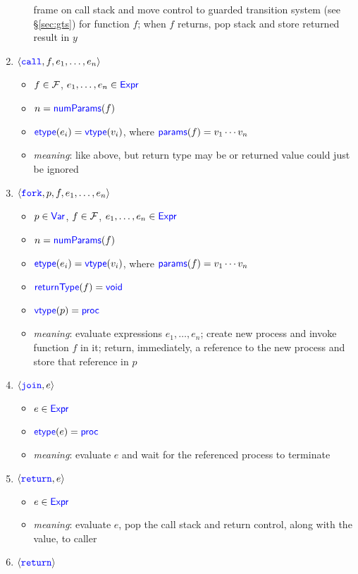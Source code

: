 \documentclass[11pt, oneside, letterpaper]{book}
\begin{document}
\begin{enumerate}
\begin{itemize}
    frame on call stack and move control to guarded transition system
    (see \S\ref{sec:gts}) for function $f$; when $f$ returns, pop
    stack and store returned result in $y$
  \end{itemize}
\item $\langle\texttt{\textcolor{blue}{call}},f,e_1,\ldots,e_n\rangle$
  \begin{itemize}
  \item $f\in\mathcal{F}$, $e_1,\ldots,e_n\in\textsf{\textcolor{blue}{\textup{Expr}}}$
  \item $n=\textsf{\textcolor{blue}{\textup{numParams}}}(f)$
  \item $\textsf{\textcolor{blue}{\textup{etype}}}(e_i)=\textsf{\textcolor{blue}{\textup{vtype}}}(v_i)$, where $\textsf{\textcolor{blue}{\textup{params}}}(f)=v_1\cdots v_n$
  \item \emph{meaning}: like above, but return type may be 
    or returned value could just be ignored
  \end{itemize}
\item $\langle\texttt{\textcolor{blue}{fork}},p,f,e_1,\ldots,e_n\rangle$
  \begin{itemize}
  \item $p\in\textsf{\textcolor{blue}{\textup{Var}}}$, $f\in\mathcal{F}$, $e_1,\ldots,e_n\in\textsf{\textcolor{blue}{\textup{Expr}}}$
  \item $n=\textsf{\textcolor{blue}{\textup{numParams}}}(f)$
  \item $\textsf{\textcolor{blue}{\textup{etype}}}(e_i)=\textsf{\textcolor{blue}{\textup{vtype}}}(v_i)$, where $\textsf{\textcolor{blue}{\textup{params}}}(f)=v_1\cdots v_n$
  \item $\textsf{\textcolor{blue}{\textup{returnType}}}(f)=\textsf{\textcolor{blue}{\textup{void}}}$
  \item $\textsf{\textcolor{blue}{\textup{vtype}}}(p)=\textsf{\textcolor{blue}{\textup{proc}}}$
  \item \emph{meaning}: evaluate expressions $e_1,\ldots,e_n$;
    create new process and invoke function $f$ in it;
    return, immediately, a reference to the new process and store
    that reference in $p$
  \end{itemize}
\item $\langle\texttt{\textcolor{blue}{join}},e\rangle$
  \begin{itemize}
  \item $e\in\textsf{\textcolor{blue}{\textup{Expr}}}$
  \item $\textsf{\textcolor{blue}{\textup{etype}}}(e)=\textsf{\textcolor{blue}{\textup{proc}}}$
  \item \emph{meaning}: evaluate $e$ and wait for the referenced process to terminate
  \end{itemize}
\item $\langle\texttt{\textcolor{blue}{return}},e\rangle$
  \begin{itemize}
  \item $e\in\textsf{\textcolor{blue}{\textup{Expr}}}$
  \item \emph{meaning}: evaluate $e$, pop the call stack and return
    control, along with the value, to caller
  \end{itemize}
\item $\langle\texttt{\textcolor{blue}{return}}\rangle$

\end{enumerate}
\end{document}
